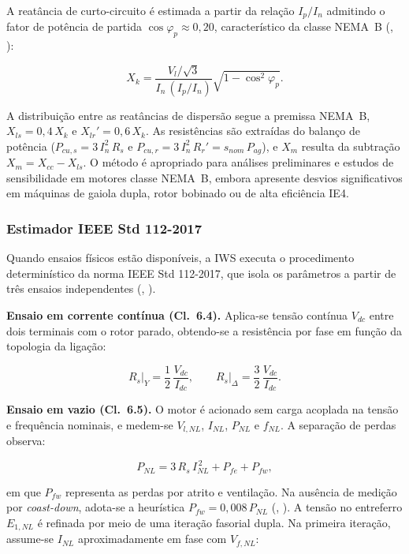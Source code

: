 A reatância de curto-circuito é estimada a partir da relação $I_p/I_n$ admitindo o fator de potência de partida $\cos\varphi_p \approx 0{,}20$, característico da classe NEMA~B (\citeauthor{li2010simulation}, \citeyear{li2010simulation}):

\begin{equation}
\label{eq:nameplate_xk}
X_k = \frac{V_l/\sqrt{3}}{I_n\,(I_p/I_n)}\sqrt{1 - \cos^2\!\varphi_p}.
\end{equation}

A distribuição entre as reatâncias de dispersão segue a premissa NEMA~B, $X_{ls} = 0{,}4\,X_k$ e $X_{lr}' = 0{,}6\,X_k$. As resistências são extraídas do balanço de potência ($P_{cu,s} = 3\,I_n^2\,R_s$ e $P_{cu,r} = 3\,I_n^2\,R_r' = s_{nom}\,P_{ag}$), e $X_m$ resulta da subtração $X_m = X_{cc} - X_{ls}$. O método é apropriado para análises preliminares e estudos de sensibilidade em motores classe NEMA~B, embora apresente desvios significativos em máquinas de gaiola dupla, rotor bobinado ou de alta eficiência IE4.

\subsubsection{Estimador IEEE Std 112-2017}

Quando ensaios físicos estão disponíveis, a IWS executa o procedimento determinístico da norma IEEE Std 112-2017, que isola os parâmetros a partir de três ensaios independentes (\citeauthor{ieee112_2017}, \citeyear{ieee112_2017}).

\textbf{Ensaio em corrente contínua (Cl.~6.4).} Aplica-se tensão contínua $V_{dc}$ entre dois terminais com o rotor parado, obtendo-se a resistência por fase em função da topologia da ligação:

\begin{equation}
\label{eq:ieee_rs}
R_s\big|_Y = \frac{1}{2}\,\frac{V_{dc}}{I_{dc}}, \qquad R_s\big|_\Delta = \frac{3}{2}\,\frac{V_{dc}}{I_{dc}}.
\end{equation}

\textbf{Ensaio em vazio (Cl.~6.5).} O motor é acionado sem carga acoplada na tensão e frequência nominais, e medem-se $V_{l,NL}$, $I_{NL}$, $P_{NL}$ e $f_{NL}$. A separação de perdas observa:

\begin{equation}
\label{eq:ieee_pnl}
P_{NL} = 3\,R_s\,I_{NL}^{\,2} + P_{fe} + P_{fw},
\end{equation}

\noindent em que $P_{fw}$ representa as perdas por atrito e ventilação. Na ausência de medição por \textit{coast-down}, adota-se a heurística $P_{fw} = 0{,}008\,P_{NL}$ (\citeauthor{ieee112_2017}, \citeyear{ieee112_2017}). A tensão no entreferro $E_{1,NL}$ é refinada por meio de uma iteração fasorial dupla. Na primeira iteração, assume-se $I_{NL}$ aproximadamente em fase com $V_{f,NL}$:

